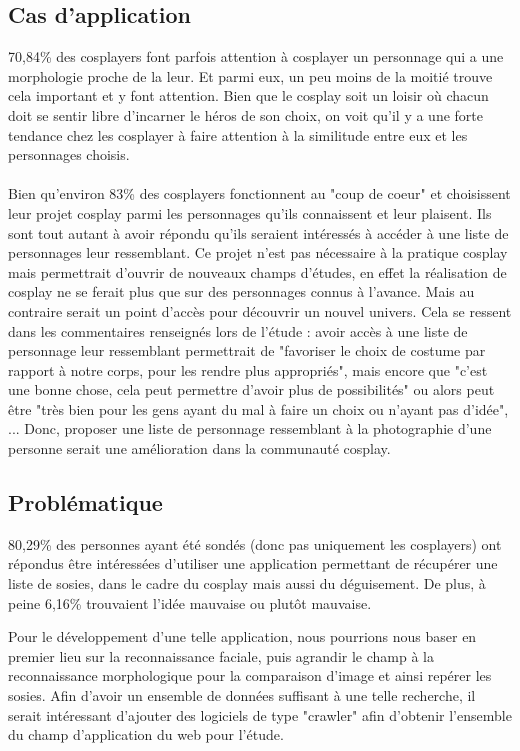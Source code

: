 \documentclass[a4paper,12pt]{article}
\begin{document}
\subsection{Cas d'application}
70,84\% des cosplayers font parfois attention à cosplayer un personnage qui a une morphologie proche de la leur. Et parmi eux, un peu moins de la moitié trouve cela important et y font attention. Bien que le cosplay soit un loisir où chacun doit se sentir libre d'incarner le héros de son choix, on voit qu'il y a une forte tendance chez les cosplayer à faire attention à la similitude entre eux et les personnages choisis. 
\\ \\
Bien qu'environ 83\% des cosplayers fonctionnent au "coup de coeur" et choisissent leur projet cosplay parmi les personnages qu'ils connaissent et leur plaisent. Ils sont tout autant à avoir répondu qu'ils seraient intéressés à accéder à une liste de personnages leur ressemblant. Ce projet n'est pas nécessaire à la pratique cosplay mais permettrait d'ouvrir de nouveaux champs d'études, en effet la réalisation de cosplay ne se ferait plus que sur des personnages connus à l'avance. Mais au contraire serait un point d'accès pour découvrir un nouvel univers. Cela se ressent dans les commentaires renseignés lors de l'étude : avoir accès à une liste de personnage leur ressemblant permettrait de "favoriser le choix de costume par rapport à notre corps, pour les rendre plus appropriés", mais encore que "c'est une bonne chose, cela peut permettre d'avoir plus de possibilités" ou alors peut être "très bien pour les gens ayant du mal à faire un choix ou n'ayant pas d'idée", ... Donc, proposer une liste de personnage ressemblant à la photographie d'une personne serait une amélioration dans la communauté cosplay.  

\subsection{Problématique}
80,29\% des personnes ayant été sondés (donc pas uniquement les cosplayers) ont répondus être intéressées d'utiliser une application permettant de récupérer une liste de sosies, dans le cadre du cosplay mais aussi du déguisement. De plus, à peine 6,16\% trouvaient l'idée mauvaise ou plutôt mauvaise. 

Pour le développement d'une telle application, nous pourrions nous baser en premier lieu sur la reconnaissance faciale, puis agrandir le champ à la reconnaissance morphologique pour la comparaison d'image et ainsi repérer les sosies. 
Afin d'avoir un ensemble de données suffisant à une telle recherche, il serait intéressant d'ajouter des logiciels de type "crawler" afin d'obtenir l'ensemble du champ d'application du web pour l'étude. 
\end{document}
